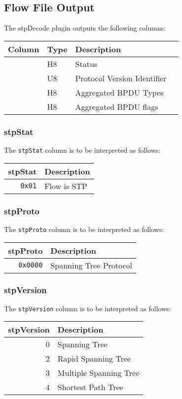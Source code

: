 \documentclass[documentation]{subfiles}
\begin{document}
\subsection{Flow File Output}
The stpDecode plugin outputs the following columns:
\begin{longtable}{llll}
    \toprule
    {\bf Column} & {\bf Type} & {\bf Description}\\
    \midrule\endhead%
    {\tt \nameref{stpStat}}    & H8 & Status \\
    {\tt \nameref{stpVersion}} & U8 & Protocol Version Identifier \\
    {\tt \nameref{stpType}}    & H8 & Aggregated BPDU Types \\
    {\tt \nameref{stpFlags}}   & H8 & Aggregated BPDU flags \\
    \bottomrule
\end{longtable}

\subsubsection{stpStat}\label{stpStat}
The {\tt stpStat} column is to be interpreted as follows:
\begin{longtable}{rl}
    \toprule
    {\bf stpStat} & {\bf Description}\\
    \midrule\endhead%
    {\tt 0x01} & Flow is STP\\
    \bottomrule
\end{longtable}

\subsubsection{stpProto}\label{stpProto}
The {\tt stpProto} column is to be interpreted as follows:
\begin{longtable}{rl}
    \toprule
    {\bf stpProto} & {\bf Description}\\
    \midrule\endhead%
    {\tt 0x0000} & Spanning Tree Protocol\\
    \bottomrule
\end{longtable}

\subsubsection{stpVersion}\label{stpVersion}
The {\tt stpVersion} column is to be interpreted as follows:
\begin{longtable}{rl}
    \toprule
    {\bf stpVersion} & {\bf Description}\\
    \midrule\endhead%
    0 & Spanning Tree\\
    2 & Rapid Spanning Tree\\
    3 & Multiple Spanning Tree\\
    4 & Shortest Path Tree\\
    \bottomrule
\end{longtable}
\end{document}
